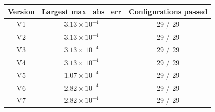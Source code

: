\begin{tabular}{ccc}
\hline
\rowcolor{headgrey}
\textbf{Version} & \textbf{Largest max\_abs\_err} & \textbf{Configurations passed} \\ \hline
V1 & $3.13 \times 10^{-4}$ & 29 / 29 \\
V2 & $3.13 \times 10^{-4}$ & 29 / 29 \\
V3 & $3.13 \times 10^{-4}$ & 29 / 29 \\
V4 & $3.13 \times 10^{-4}$ & 29 / 29 \\
V5 & $1.07 \times 10^{-4}$ & 29 / 29 \\
V6 & $2.82 \times 10^{-4}$ & 29 / 29 \\
V7 & $2.82 \times 10^{-4}$ & 29 / 29 \\
\hline
\end{tabular}

